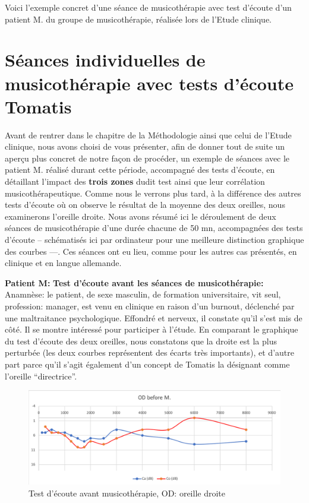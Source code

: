 Voici l'exemple concret d'une  séance de
musicothérapie  avec test d'écoute  d'un 
patient M. du groupe de musicothérapie, réalisée lors de l'Etude clinique.

 \clearpage



\section{ Séances individuelles  de musicothérapie avec tests d'écoute Tomatis}

Avant de rentrer dans le chapitre de la Méthodologie ainsi que celui de l'Etude clinique, nous avons 
choisi de vous présenter,  afin de donner tout de suite un aperçu plus concret  de notre façon de 
procéder, un exemple de 
séances avec le 
patient M. réalisé durant cette 
période, accompagné des tests d'écoute, en détaillant 
l'impact
des\textbf{ trois zones} dudit test ainsi que  leur corrélation musicothérapeutique. Comme nous le 
verrons plus tard, à la différence des 
autres tests d'écoute où on observe le résultat de la moyenne des deux oreilles, nous examinerons 
l'oreille droite.
Nous avons résumé ici le déroulement de deux séances de
musicothérapie d'une durée chacune  de 50 mn,  accompagnées des tests d'écoute --  
schématisés ici  par ordinateur pour une meilleure 
distinction graphique des courbes ---. Ces séances ont eu lieu, comme pour les autres cas 
présentés, en clinique et en langue allemande.

\textbf{Patient M:}
\textbf{ Test d'écoute avant les séances de musicothérapie:}
Anamnèse: le patient, %
 de sexe masculin, de formation universitaire, vit seul, profession: 
manager,  est venu en clinique en raison d'un 
burnout, déclenché par 
une maltraitance psychologique. Effondré et nerveux, il  constate qu'il s'est mis de côté. Il se montre
intéressé pour participer à l'étude. En comparant le graphique du test d'écoute des deux oreilles, nous 
constatons que la droite est la plus perturbée (les deux courbes représentent des écarts très 
importants), et d'autre part parce 
qu'il s'agit également d'un concept de Tomatis la désignant comme l'oreille ``directrice''.


\begin{figure}[tbh]
	\centering
	\includegraphics[width=1\linewidth]{images/clinique/od_before_m.png}
	\caption{Test d'écoute avant musicothérapie, OD: oreille droite}
	\label{fig:odbeforemeyer}
\end{figure}


